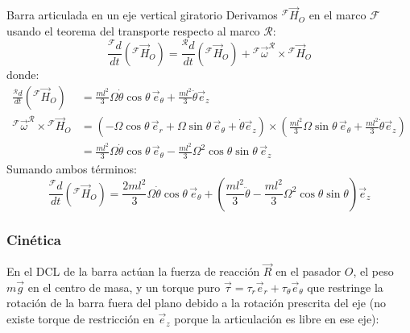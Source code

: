 \begin{solucion}{Barra articulada en un eje vertical giratorio}
Derivamos ${}^{\mathcal{F}}\vec{H}_O$ en el marco $\mathcal{F}$ usando el teorema del transporte respecto al marco $\mathcal{R}$:
\begin{equation}
    \frac{{}^{\mathcal{F}}d}{dt}({}^{\mathcal{F}}\vec{H}_O) = \frac{{}^{\mathcal{R}}d}{dt}({}^{\mathcal{F}}\vec{H}_O) + {}^{\mathcal{F}}\vec{\omega}^{\mathcal{R}} \times {}^{\mathcal{F}}\vec{H}_O
\end{equation}
donde:
\begin{align}
    \frac{{}^{\mathcal{R}}d}{dt}({}^{\mathcal{F}}\vec{H}_O) &= \frac{ml^2}{3}\Omega\dot{\theta}\cos\theta\,\vec{e}_\theta + \frac{ml^2}{3}\ddot{\theta}\vec{e}_z \\
    {}^{\mathcal{F}}\vec{\omega}^{\mathcal{R}} \times {}^{\mathcal{F}}\vec{H}_O &= (-\Omega\cos\theta\,\vec{e}_r + \Omega\sin\theta\,\vec{e}_\theta + \dot{\theta}\vec{e}_z) \times \left(\frac{ml^2}{3}\Omega\sin\theta\,\vec{e}_\theta + \frac{ml^2}{3}\dot{\theta}\vec{e}_z\right) \nonumber \\
    &= \frac{ml^2}{3}\Omega\dot{\theta}\cos\theta\,\vec{e}_\theta - \frac{ml^2}{3}\Omega^2\cos\theta\sin\theta\,\vec{e}_z
\end{align}
Sumando ambos términos:
\begin{equation}
    \frac{{}^{\mathcal{F}}d}{dt}({}^{\mathcal{F}}\vec{H}_O) = \frac{2ml^2}{3}\Omega\dot{\theta}\cos\theta\,\vec{e}_\theta + \left(\frac{ml^2}{3}\ddot{\theta} - \frac{ml^2}{3}\Omega^2\cos\theta\sin\theta\right)\vec{e}_z
\end{equation}

\subsubsection*{Cinética}

En el DCL de la barra actúan la fuerza de reacción $\vec{R}$ en el pasador $O$, el peso $m\vec{g}$ en el centro de masa, y un torque puro $\vec{\tau} = \tau_r\vec{e}_r + \tau_\theta\vec{e}_\theta$ que restringe la rotación de la barra fuera del plano debido a la rotación prescrita del eje (no existe torque de restricción en $\vec{e}_z$ porque la articulación es libre en ese eje):

\begin{center}
\end{center}
\end{solucion}
